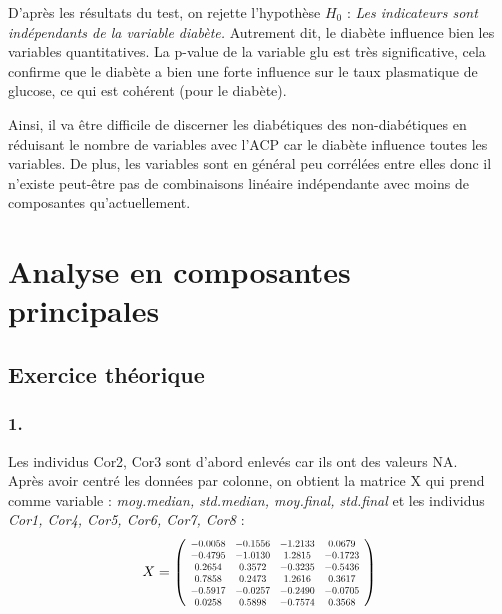 \documentclass{article}
\newcommand\scalemath[2]{\scalebox{#1}{\mbox{\ensuremath{\displaystyle #2}}}} %
\begin{document}
D'après les résultats du test, on rejette l'hypothèse $H_{0}$ : \textit{Les indicateurs sont indépendants de la variable diabète.} Autrement dit, le diabète influence bien les variables quantitatives. La p-value de la variable glu est très significative, cela confirme que le diabète a bien une forte influence sur le taux plasmatique de glucose, ce qui est cohérent (pour le diabète).

Ainsi, il va être difficile de discerner les diabétiques des non-diabétiques en réduisant le nombre de variables avec l'ACP car le diabète influence toutes les variables. De plus, les variables sont en général peu corrélées entre elles donc il n'existe peut-être pas de combinaisons linéaire indépendante avec moins de composantes qu'actuellement.

\section{Analyse en composantes principales}

\subsection{Exercice théorique}
\label{2.}
\subsubsection*{1.}
Les individus Cor2, Cor3 sont d'abord enlevés car ils ont des valeurs NA.\\
Après avoir centré les données par colonne, on obtient la matrice X qui prend comme variable : \textit{moy.median, std.median, moy.final, std.final} et les individus \textit{Cor1, Cor4, Cor5, Cor6, Cor7, Cor8} :
\begin{equation} 
X=
\left(   
\scalemath{0.70}{
  \begin{array}{cccc}   
    -0.0058 & -0.1556 & -1.2133  &0.0679\\  
    -0.4795 &-1.0130 &1.2815       & -0.1723\\  
     0.2654 & 0.3572 &-0.3235& -0.5436\\
      0.7858 &0.2473  &1.2616  &0.3617\\
      -0.5917 &-0.0257 &-0.2490 &-0.0705\\
      0.0258  &0.5898 &-0.7574  &0.3568\\
    
  \end{array}
  }
\right)                 
\end{equation}
\end{document}
